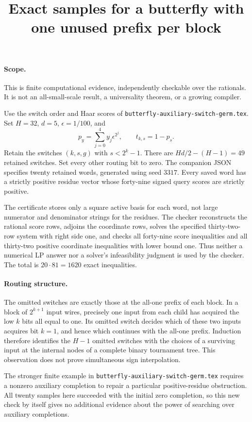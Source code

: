 \documentclass[11pt]{article}
\begin{document}
\title{Exact samples for a butterfly with one unused prefix per block}
\author{}\date{}\maketitle
\paragraph{Scope.}
This is finite computational evidence, independently checkable over the
rationals. It is not an all-small-scale result, a universality theorem,
or a growing compiler.

Use the switch order and Haar scores of
\texttt{butterfly-auxiliary-switch-germ.tex}. Set $H=32$, $d=5$,
$\epsilon=1/100$, and
\[
 p_y=\sum_{j=0}^4y_j\epsilon^{2^j},\qquad t_{k,s}=1-p_s.
\]
Retain the switches $(k,s,g)$ with $s<2^k-1$. There are
$Hd/2-(H-1)=49$ retained switches. Set every other routing bit to zero.
The companion JSON specifies twenty retained words, generated using
seed $3317$. Every saved word has a strictly positive residue vector
whose forty-nine signed query scores are strictly positive.

The certificate stores only a square active basis for each word, not
large numerator and denominator strings for the residues. The checker
reconstructs the rational score rows, adjoins the coordinate rows,
solves the specified thirty-two-row system with right side one, and
checks all forty-nine score inequalities and all thirty-two positive
coordinate inequalities with lower bound one. Thus neither a numerical
LP answer nor a solver's infeasibility judgment is used by the checker.
The total is $20\cdot81=1620$ exact inequalities.

\paragraph{Routing structure.}
The omitted switches are exactly those at the all-one prefix of each
block. In a block of $2^{k+1}$ input wires, precisely one input from
each child has acquired the low $k$ bits all equal to one. Its omitted
switch decides which of these two inputs acquires bit $k=1$, and hence
which continues with the all-one prefix. Induction therefore identifies
the $H-1$ omitted switches with the choices of a surviving input at the
internal nodes of a complete binary tournament tree. This observation
does not prove simultaneous sign interpolation.

The stronger finite example in
\texttt{butterfly-auxiliary-switch-germ.tex} requires a nonzero auxiliary
completion to repair a particular positive-residue obstruction. All
twenty samples here succeeded with the initial zero completion, so this
new check by itself gives no additional evidence about the power of
searching over auxiliary completions.
\end{document}
